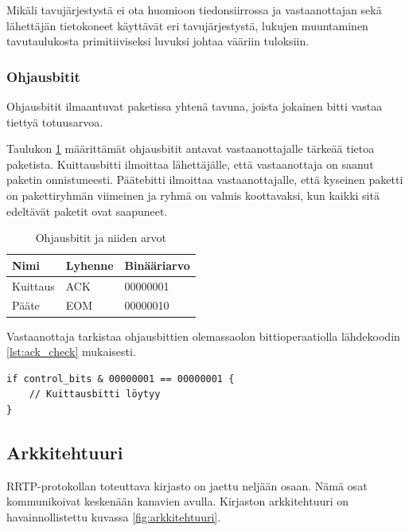 \documentclass[a4paper,12pt]{article}
\begin{document}
    Mikäli tavujärjestystä ei ota huomioon tiedonsiirrossa ja vastaanottajan sekä lähettäjän tietokoneet käyttävät eri tavujärjestystä, lukujen muuntaminen tavutaulukosta primitiiviseksi luvuksi johtaa vääriin tuloksiin.
    \cite{Adiga2007HowC}

    \subsubsection{Ohjausbitit}\label{subsec:control_bits}
    Ohjausbitit ilmaantuvat paketissa yhtenä tavuna, joista jokainen bitti vastaa tiettyä totuusarvoa.

    Taulukon \ref{tab:control_bits} määrittämät ohjausbitit antavat vastaanottajalle tärkeää tietoa paketista. Kuittausbitti ilmoittaa lähettäjälle, että vastaanottaja on saanut paketin onnistuneesti. Päätebitti ilmoittaa vastaanottajalle, että kyseinen paketti on pakettiryhmän viimeinen ja ryhmä on valmis koottavaksi, kun kaikki sitä edeltävät paketit ovat saapuneet. \par
    
    \begin{table}[h!]
        \centering
        \begin{tabular}{lll}
            Nimi     & Lyhenne & Binääriarvo \\
            \hline
            Kuittaus & ACK     & 00000001    \\
            Pääte    & EOM     & 00000010    \\
        \end{tabular}
        \caption{Ohjausbitit ja niiden arvot}
        \label{tab:control_bits}
    \end{table}


    Vastaanottaja tarkistaa ohjausbittien olemassaolon bittioperaatiolla lähdekoodin \ref{lst:ack_check} mukaisesti.
    
    \begin{lstlisting}[float, caption={Kuittausbitin tarkistus ohjausbiteistä}, label={lst:ack_check}]
if control_bits & 00000001 == 00000001 {
    // Kuittausbitti löytyy
}\end{lstlisting}

    \subsection{Arkkitehtuuri}\label{sec:arkkitehtuuri}
    RRTP-protokollan toteuttava kirjasto on jaettu neljään osaan. Nämä osat kommunikoivat keskenään kanavien avulla. Kirjaston arkkitehtuuri on havainnollistettu kuvassa \ref{fig:arkkitehtuuri}. 
\end{document}
